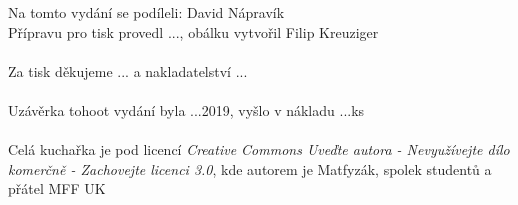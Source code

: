 Na tomto vydání se podíleli: David Nápravík \\
Přípravu pro tisk provedl ..., obálku vytvořil Filip Kreuziger\\
\\
Za tisk děkujeme ... a nakladatelství ... \\
\\
Uzávěrka tohoot vydání byla ...2019, vyšlo v nákladu ...ks \\
\\
Celá kuchařka je pod licencí \textit{Creative Commons Uveďte autora - Nevyužívejte dílo komerčně - Zachovejte licenci 3.0}, kde autorem je Matfyzák, spolek studentů a přátel MFF UK

\newpage
